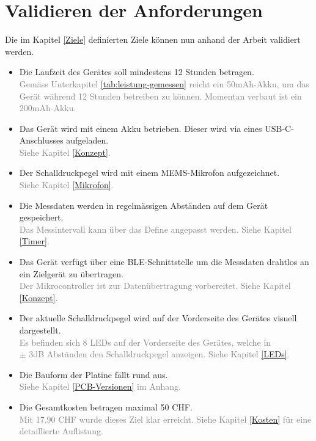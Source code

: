 \documentclass[12pt]{article}
\newcommand{\greencheck}{{\color{green}\checkmark}}
\begin{document}
	\section{Validieren der Anforderungen} \label{Validierung}
	Die im Kapitel \ref{Ziele} definierten Ziele können nun anhand der Arbeit validiert werden.
	\begin{itemize}
		\item [\greencheck] Die Laufzeit des Gerätes soll mindestens 12 Stunden betragen. \\
		\textcolor{gray}{Gemäss Unterkapitel \ref{tab:leistung-gemessen} reicht ein 50mAh-Akku, um das Gerät während 12 Stunden betreiben zu können. Momentan verbaut ist ein 200mAh-Akku.}
		\item [\greencheck] Das Gerät wird mit einem Akku betrieben. Dieser wird via eines USB-C-Anschlusses aufgeladen. \\
		\textcolor{gray}{Siehe Kapitel \ref{Konzept}.}
		\item [\greencheck] Der Schalldruckpegel wird mit einem MEMS-Mikrofon aufgezeichnet. \\
		\textcolor{gray}{Siehe Kapitel \ref{Mikrofon}.}
		\item [\greencheck] Die Messdaten werden in regelmässigen Abständen auf dem Gerät gespeichert. \\
		\textcolor{gray}{Das Messintervall kann über das Define angepasst werden. Siehe Kapitel \ref{Timer}.}
		\item [\greencheck] Das Gerät verfügt über eine BLE-Schnittstelle um die Messdaten drahtlos an ein Zielgerät zu übertragen.\\
		\textcolor{gray}{Der Mikrocontroller ist zur Datenübertragung vorbereitet. Siehe Kapitel \ref{Konzept}.}
		\item [\greencheck] Der aktuelle Schalldruckpegel wird auf der Vorderseite des Gerätes visuell dargestellt. \\
		\textcolor{gray}{Es befinden sich 8 LEDs auf der Vorderseite des Gerätes, welche in \\ $\pm$ 3dB Abständen den Schalldruckpegel anzeigen. Siehe Kapitel \ref{LEDs}.}
		\item [\greencheck] Die Bauform der Platine fällt rund aus. \\
		\textcolor{gray}{Siehe Kapitel \ref{PCB-Versionen} im Anhang.}
		\item [\greencheck] Die Gesamtkosten betragen maximal 50 CHF. \\
		\textcolor{gray}{Mit 17.90 CHF wurde dieses Ziel klar erreicht. Siehe Kapitel \ref{Kosten} für eine detaillierte Auflistung.}
	\end{itemize}
	
\end{document}
